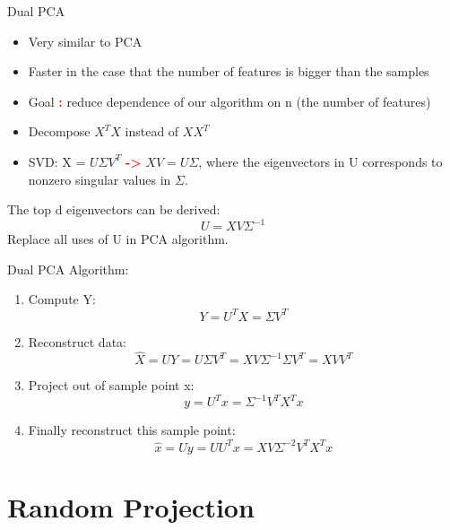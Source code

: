 \documentclass[10pt]{beamer}
\begin{document}
\begin{frame}{Dual PCA}
	\begin{itemize}
	\item Very similar to PCA
    \item Faster in the case that the number of features is bigger than the samples
    \item Goal \textcolor{red}{\textbf{:}} reduce dependence of our algorithm on n (the number of features)
    \item Decompose $X^TX$ instead of $XX^T$
    \item  SVD: X = $U\Sigma V^T$ \textcolor{red}{\textbf{->}} $XV = U\Sigma$, where the eigenvectors in U corresponds to nonzero singular values in $\Sigma$.
	\end{itemize}
The top d eigenvectors can be derived:
\begin{equation}
U = XV\Sigma^{-1}
\end{equation}
Replace all uses of U in PCA algorithm.\\
\end{frame}

\begin{frame}{Dual PCA}
Algorithm:
\begin{enumerate}
\item {Compute Y: \begin{equation} Y = U^TX = \Sigma V^T \end{equation}}
\item {Reconstruct data: \begin{equation}
\hat{X} = UY = U\Sigma V^T = XV\Sigma^{-1}\Sigma V^T = XVV^T \end{equation}}
\item {Project out of sample point x:
\begin{equation}
y = U^T x = \Sigma^{-1} V^T X^T x 
\end{equation}}
\item {Finally reconstruct this sample point:
\begin{equation}
\hat{x} = U y = UU^T x = XV\Sigma^{-2} V^T X^T x 
\end{equation}}
\end{enumerate}
\end{frame}

\section{Random Projection}
\end{document}
